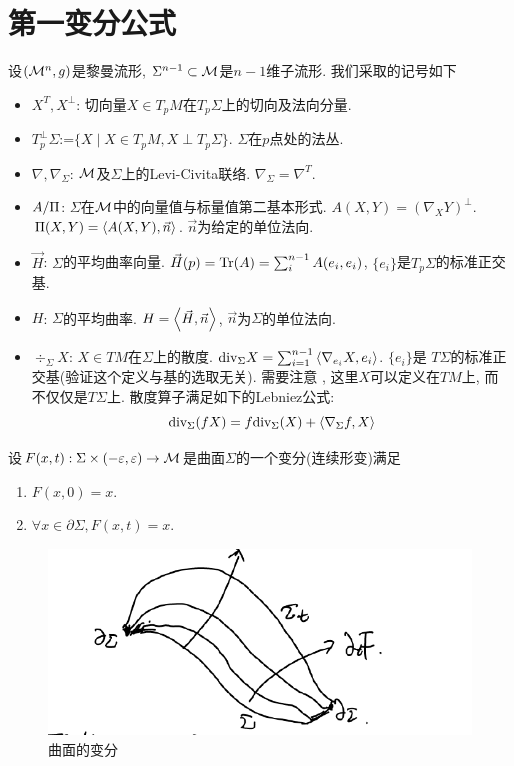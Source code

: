 \section{第一变分公式} \label{sec_first_variation}
设$({\mathcal{M}}^n,g)$是黎曼流形, $\Sigma^{n-1}\subset {\mathcal{M}}$是$n-1$维子流形. 我们采取的记号如下
\begin{itemize}
    \item $X^T,X^\perp$: 切向量$X \in T_pM$在$T_p\Sigma$上的切向及法向分量.
    \item $T_p^\perp \Sigma$:=$\{X\mid X\in T_pM, X\perp T_p\Sigma\}$. $\Sigma$在$p$点处的法丛.
    \item $\nabla,\nabla_\Sigma$: ${\mathcal{M}}$及$\Sigma$上的Levi-Civita联络. $\nabla_\Sigma=\nabla^{T}$.
    \item $A/{\Pi}$: $\Sigma$在${\mathcal{M}}$中的向量值与标量值第二基本形式. $A(X,Y)=(\nabla_XY)^\perp$. ${\Pi}(X,Y)={\left < A(X,Y), \vec{n} \right >}$. $\vec{n}$为给定的单位法向.
    \item $\vec{H}$: $\Sigma$的平均曲率向量. $\vec{H}(p)=\text{Tr}(A)=\sum_{i}^{n-1}A(e_i,e_i)$, $\{e_i\}$是$T_p\Sigma$的标准正交基.
    \item ${H}$: $\Sigma$的平均曲率. $H={\left < \vec{H}, \vec{n} \right >}$, $\vec{n}$为$\Sigma$的单位法向.
    \item $\div_\Sigma X$: $X \in TM$在$\Sigma$上的散度. ${\text{div}}_\Sigma X=\sum_{i=1}^{n-1}{\left < \nabla_{e_i}X, e_i \right >}$. $\{e_i\}$是 $T\Sigma$的标准正交基(验证这个定义与基的选取无关). 需要注意 , 这里$X$可以定义在$TM$上, 而不仅仅是$T\Sigma$上. 散度算子满足如下的Lebniez公式:
    \begin{equation}
        {\text{div}}_\Sigma(fX)=f{\text{div}}_\Sigma(X)+{\left < \nabla_\Sigma f, X \right >}
    \end{equation}
\end{itemize}
设$F(x,t): \Sigma \times (-\varepsilon, \varepsilon) \to {\mathcal{M}}$是曲面$\Sigma$的一个变分(连续形变)满足
\begin{enumerate}
    \item $F(x,0)=x$.
    \item $\forall x \in \partial \Sigma, F(x,t)=x$.
\end{enumerate}

\begin{figure}[ht]
	\centering
	\includegraphics[scale=0.8]{images/variation.png}
	\caption{曲面的变分}
	\label{variation_p}
\end{figure}


